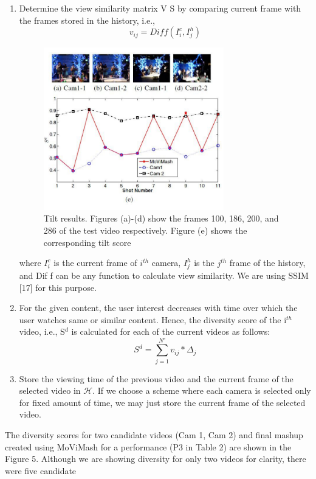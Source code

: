 \documentclass{sig-alternate-05-2015}
\begin{document}
\begin{enumerate}
  \item Determine the view similarity matrix V S by comparing current frame with the frames stored in the history, i.e.,
  \begin{equation}
      v_{ij} = Diff(I^c_i,I^h_j)
  \end{equation}
  \begin{figure}
\centering
\includegraphics[width=1\linewidth,height=200pt]{video_3.pdf}
\caption{Tilt results. Figures (a)-(d) show the frames 100, 186,
200, and 286 of the test video respectively. Figure (e) shows the
corresponding tilt score}
\end{figure}
  where $I^c_i$ is the current frame of $i^{th}$ camera, $I^h_j$ is the $j^{th}$
frame of the history, and Dif f can be any function to calculate view similarity. We are using SSIM [17] for this purpose.
  \item For the given content, the user interest decreases with time
over which the user watches same or similar content. Hence,
the diversity score of the i$^{th}$ video, i.e., S$^d$ is calculated for
each of the current videos as follows:
\begin{equation}
    S^d = \sum_{j=1}^{N^v}v_{ij}*\Delta_j
\end{equation}
    \item Store the viewing time of the previous video and the current
frame of the selected video in $\mathcal{H}$. If we choose a scheme
where each camera is selected only for fixed amount of time,
we may just store the current frame of the selected video.
\end{enumerate}
The diversity scores for two candidate videos (Cam 1, Cam 2)
and final mashup created using MoViMash for a performance (P3
in Table 2) are shown in the Figure 5. Although we are showing
diversity for only two videos for clarity, there were five candidate
\end{document}

